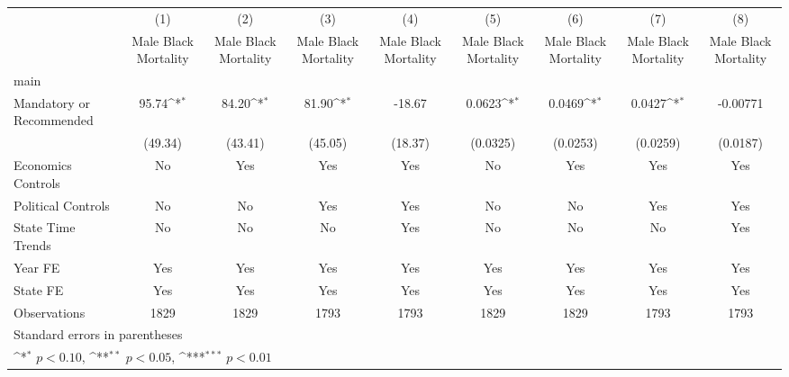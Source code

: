 {
\def\sym#1{\ifmmode^{#1}\else\(^{#1}\)\fi}
\begin{longtable}{l*{8}{c}}
\hline\hline\endfirsthead\hline\endhead\hline\endfoot\endlastfoot
                    &\multicolumn{1}{c}{(1)}&\multicolumn{1}{c}{(2)}&\multicolumn{1}{c}{(3)}&\multicolumn{1}{c}{(4)}&\multicolumn{1}{c}{(5)}&\multicolumn{1}{c}{(6)}&\multicolumn{1}{c}{(7)}&\multicolumn{1}{c}{(8)}\\
                    &\multicolumn{1}{c}{Male Black Mortality}&\multicolumn{1}{c}{Male Black Mortality}&\multicolumn{1}{c}{Male Black Mortality}&\multicolumn{1}{c}{Male Black Mortality}&\multicolumn{1}{c}{Male Black Mortality}&\multicolumn{1}{c}{Male Black Mortality}&\multicolumn{1}{c}{Male Black Mortality}&\multicolumn{1}{c}{Male Black Mortality}\\
\hline
main                &                     &                     &                     &                     &                     &                     &                     &                     \\
Mandatory or Recommended&       95.74\sym{*}  &       84.20\sym{*}  &       81.90\sym{*}  &      -18.67         &      0.0623\sym{*}  &      0.0469\sym{*}  &      0.0427\sym{*}  &    -0.00771         \\
                    &     (49.34)         &     (43.41)         &     (45.05)         &     (18.37)         &    (0.0325)         &    (0.0253)         &    (0.0259)         &    (0.0187)         \\
[1em]
Economics Controls  &          No         &         Yes         &         Yes         &         Yes         &          No         &         Yes         &         Yes         &         Yes         \\
[1em]
Political Controls  &          No         &          No         &         Yes         &         Yes         &          No         &          No         &         Yes         &         Yes         \\
[1em]
State Time Trends   &          No         &          No         &          No         &         Yes         &          No         &          No         &          No         &         Yes         \\
[1em]
Year FE             &         Yes         &         Yes         &         Yes         &         Yes         &         Yes         &         Yes         &         Yes         &         Yes         \\
[1em]
State FE            &         Yes         &         Yes         &         Yes         &         Yes         &         Yes         &         Yes         &         Yes         &         Yes         \\
\hline
Observations        &        1829         &        1829         &        1793         &        1793         &        1829         &        1829         &        1793         &        1793         \\
\hline\hline
\multicolumn{9}{l}{\footnotesize Standard errors in parentheses}\\
\multicolumn{9}{l}{\footnotesize \sym{*} \(p<0.10\), \sym{**} \(p<0.05\), \sym{***} \(p<0.01\)}\\
\end{longtable}
}
